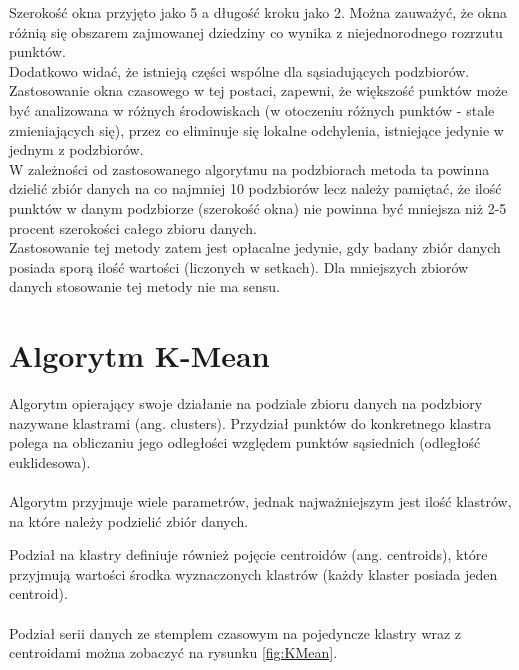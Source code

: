 \documentclass[eng,printmode]{mgr}
\begin{document}
Szerokość okna przyjęto jako 5 a długość kroku jako 2. Można zauważyć, że okna różnią się obszarem zajmowanej dziedziny co wynika z niejednorodnego rozrzutu punktów.
\\
Dodatkowo widać, że istnieją części wspólne dla sąsiadujących podzbiorów. Zastosowanie okna czasowego w tej postaci, zapewni, że większość punktów może być analizowana w różnych środowiskach (w otoczeniu różnych punktów - stale zmieniających się), przez co eliminuje się lokalne odchylenia, istniejące jedynie w jednym z podzbiorów.
\\
W zależności od zastosowanego algorytmu na podzbiorach metoda ta powinna dzielić zbiór danych na co najmniej 10 podzbiorów lecz należy pamiętać, że ilość punktów w danym podzbiorze (szerokość okna) nie powinna być mniejsza niż 2-5 procent szerokości całego zbioru danych.
\\
Zastosowanie tej metody zatem jest opłacalne jedynie, gdy badany zbiór danych posiada sporą ilość wartości (liczonych w setkach). Dla mniejszych zbiorów danych stosowanie tej metody nie ma sensu. 

\section{Algorytm K-Mean}
Algorytm opierający swoje działanie na podziale zbioru danych na podzbiory nazywane klastrami (ang. clusters). Przydział punktów do konkretnego klastra polega na obliczaniu jego odległości względem punktów sąsiednich (odległość euklidesowa). \\ \\
Algorytm przyjmuje wiele parametrów, jednak najważniejszym jest ilość klastrów, na które należy podzielić zbiór danych.

Podział na klastry definiuje również pojęcie centroidów (ang. centroids), które przyjmują wartości środka wyznaczonych klastrów (każdy klaster posiada jeden centroid). \\ \\

Podział serii danych ze stemplem czasowym na pojedyncze klastry wraz z centroidami można zobaczyć na rysunku \ref{fig:KMean}.
\end{document}
